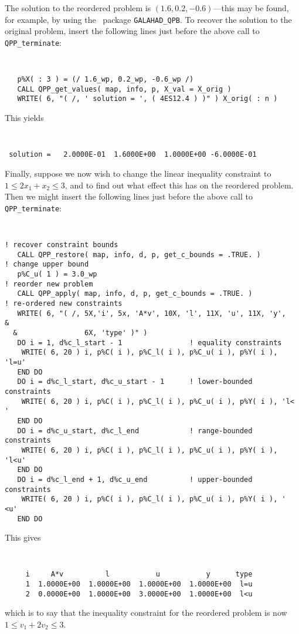 \documentclass{galahad}
\newcommand{\packagename}{QPP}
\begin{document}
The solution to the reordered problem is $(1.6, 0.2, -0.6)$---this may
be found, for example, by using
the \galahad\ package {\tt GALAHAD\_QPB}. To recover the solution to the
original problem, insert the following lines just before the
above call to {\tt \packagename\_terminate}:
{\tt \small
\begin{verbatim}
   p%X( : 3 ) = (/ 1.6_wp, 0.2_wp, -0.6_wp /)
   CALL QPP_get_values( map, info, p, X_val = X_orig )
   WRITE( 6, "( /, ' solution = ', ( 4ES12.4 ) )" ) X_orig( : n )
\end{verbatim}
}
\noindent
This yields
{\tt \small
\begin{verbatim}
 solution =   2.0000E-01  1.6000E+00  1.0000E+00 -6.0000E-01
\end{verbatim}
}
\noindent
Finally, suppose we now wish to change the linear
inequality constraint to $1 \leq 2 x_1 + x_2 \leq 3$, and
to find out what effect this has on the reordered problem. Then
we might insert the following lines just before the
above call to {\tt \packagename\_terminate}:
{\tt \small
\begin{verbatim}
! recover constraint bounds
   CALL QPP_restore( map, info, d, p, get_c_bounds = .TRUE. )
! change upper bound
   p%C_u( 1 ) = 3.0_wp
! reorder new problem
   CALL QPP_apply( map, info, d, p, get_c_bounds = .TRUE. )
! re-ordered new constraints
   WRITE( 6, "( /, 5X,'i', 5x, 'A*v', 10X, 'l', 11X, 'u', 11X, 'y',            &
  &                6X, 'type' )" )
   DO i = 1, d%c_l_start - 1                ! equality constraints
    WRITE( 6, 20 ) i, p%C( i ), p%C_l( i ), p%C_u( i ), p%Y( i ), 'l=u'
   END DO
   DO i = d%c_l_start, d%c_u_start - 1      ! lower-bounded constraints
    WRITE( 6, 20 ) i, p%C( i ), p%C_l( i ), p%C_u( i ), p%Y( i ), 'l< '
   END DO
   DO i = d%c_u_start, d%c_l_end            ! range-bounded constraints
    WRITE( 6, 20 ) i, p%C( i ), p%C_l( i ), p%C_u( i ), p%Y( i ), 'l<u'
   END DO
   DO i = d%c_l_end + 1, d%c_u_end          ! upper-bounded constraints
    WRITE( 6, 20 ) i, p%C( i ), p%C_l( i ), p%C_u( i ), p%Y( i ), ' <u'
   END DO
\end{verbatim}
}
\noindent
This gives
{\tt \small
\begin{verbatim}
     i     A*v          l           u           y      type
     1  1.0000E+00  1.0000E+00  1.0000E+00  1.0000E+00  l=u
     2  0.0000E+00  1.0000E+00  3.0000E+00  1.0000E+00  l<u
\end{verbatim}
}
\noindent
which is to say that the inequality constraint for the reordered problem is now
$1 \leq v_1 + 2 v_2 \leq 3$.
\end{document}
